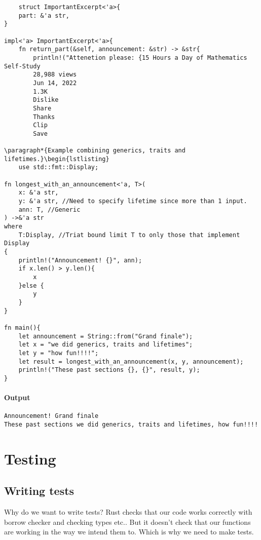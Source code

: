 \begin{lstlisting}
    struct ImportantExcerpt<'a>{
    part: &'a str,
}

impl<'a> ImportantExcerpt<'a>{
    fn return_part(&self, announcement: &str) -> &str{
        println!("Attenetion please: {15 Hours a Day of Mathematics Self-Study
        28,988 views
        Jun 14, 2022
        1.3K
        Dislike
        Share
        Thanks
        Clip
        Save
        
\paragraph*{Example combining generics, traits and lifetimes.}\begin{lstlisting}
    use std::fmt::Display;

fn longest_with_an_announcement<'a, T>(
    x: &'a str,
    y: &'a str, //Need to specify lifetime since more than 1 input.
    ann: T, //Generic
) ->&'a str
where
    T:Display, //Triat bound limit T to only those that implement Display
{
    println!("Announcement! {}", ann);
    if x.len() > y.len(){
        x
    }else {
        y
    }
}

fn main(){
    let announcement = String::from("Grand finale");
    let x = "we did generics, traits and lifetimes";
    let y = "how fun!!!!";
    let result = longest_with_an_announcement(x, y, announcement);
    println!("These past sections {}, {}", result, y);
}
\end{lstlisting}

\paragraph*{Output}\begin{lstlisting}
Announcement! Grand finale
These past sections we did generics, traits and lifetimes, how fun!!!!
\end{lstlisting}

\section{Testing}

\subsection{Writing tests}

Why do we want to write tests? Rust checks that our code works correctly with borrow checker and checking types etc.. But it doesn't check that our functions are 
working in the way we intend them to. Which is why we need to make tests. 


